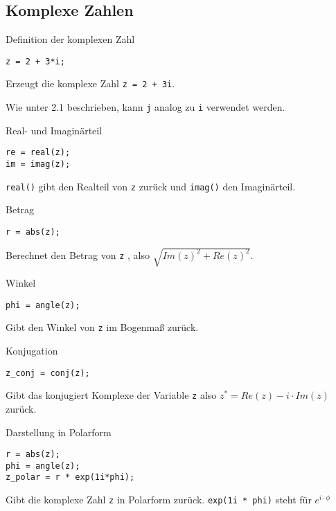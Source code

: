         \subsection{Komplexe Zahlen}
        \begin{CodeErklaerungBox}{Definition der komplexen Zahl}
                \begin{lstlisting}
z = 2 + 3*i;
                \end{lstlisting}
                \tcblower
                Erzeugt die komplexe Zahl \texttt{z = 2 + 3i}. 
                \end{CodeErklaerungBox}
                \noindent Wie unter 2.1 beschrieben, kann \texttt{j} analog zu \texttt{i} verwendet werden.
                \begin{CodeErklaerungBox}{Real- und Imaginärteil}
                \begin{lstlisting}
re = real(z);
im = imag(z);
                \end{lstlisting}
                \tcblower
                \texttt{real()} gibt den Realteil von \texttt{z} zurück und \texttt{imag()} den Imaginärteil.
                \end{CodeErklaerungBox}
                \begin{CodeErklaerungBox}{Betrag}
                \begin{lstlisting}
r = abs(z);
                \end{lstlisting}
                \tcblower
                Berechnet den Betrag von \texttt{z} , also $\sqrt{Im(z)^2 + Re(z)^2}$.
                \end{CodeErklaerungBox}
                \begin{CodeErklaerungBox}{Winkel}
                \begin{lstlisting}
phi = angle(z);
                \end{lstlisting}
                \tcblower
                Gibt den Winkel von \texttt{z} im Bogenmaß zurück.
                \end{CodeErklaerungBox}
                \begin{CodeErklaerungBox}{Konjugation}
                \begin{lstlisting}
z_conj = conj(z);
                \end{lstlisting}
                \tcblower
                Gibt das konjugiert Komplexe der Variable \texttt{z} also $z^* = Re(z) - i\cdot Im(z)$ zurück.
                \end{CodeErklaerungBox}
                \begin{CodeErklaerungBox}{Darstellung in Polarform}
                \begin{lstlisting}
r = abs(z);
phi = angle(z);
z_polar = r * exp(1i*phi);
                \end{lstlisting}
                \tcblower
                Gibt die komplexe Zahl \texttt{z} in Polarform zurück. \texttt{exp(1i * phi)} steht für $e^{i \cdot \phi}$
                \end{CodeErklaerungBox}
                \newpage
